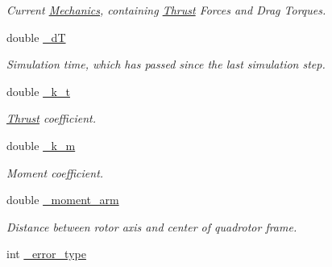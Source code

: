\begin{DoxyCompactItemize}
\begin{DoxyCompactList}\small\item\em \-Current \hyperlink{classMechanics}{\-Mechanics}, containing \hyperlink{classThrust}{\-Thrust} \-Forces and \-Drag \-Torques. \end{DoxyCompactList}\item 
\hypertarget{classQuadRotorDynamics_acb408bb34e58205c8c9239de6755a1ec}{double \hyperlink{classQuadRotorDynamics_acb408bb34e58205c8c9239de6755a1ec}{\-\_\-d\-T}}\label{classQuadRotorDynamics_acb408bb34e58205c8c9239de6755a1ec}

\begin{DoxyCompactList}\small\item\em \-Simulation time, which has passed since the last simulation step. \end{DoxyCompactList}\item 
\hypertarget{classQuadRotorDynamics_ad16ff51ab4ce8bec56f953da64fb71b9}{double \hyperlink{classQuadRotorDynamics_ad16ff51ab4ce8bec56f953da64fb71b9}{\-\_\-k\-\_\-t}}\label{classQuadRotorDynamics_ad16ff51ab4ce8bec56f953da64fb71b9}

\begin{DoxyCompactList}\small\item\em \hyperlink{classThrust}{\-Thrust} coefficient. \end{DoxyCompactList}\item 
\hypertarget{classQuadRotorDynamics_acf8efb67931462dba06fe187661010a7}{double \hyperlink{classQuadRotorDynamics_acf8efb67931462dba06fe187661010a7}{\-\_\-k\-\_\-m}}\label{classQuadRotorDynamics_acf8efb67931462dba06fe187661010a7}

\begin{DoxyCompactList}\small\item\em \-Moment coefficient. \end{DoxyCompactList}\item 
\hypertarget{classQuadRotorDynamics_af531365138f761c7210d78da8c92e95a}{double \hyperlink{classQuadRotorDynamics_af531365138f761c7210d78da8c92e95a}{\-\_\-moment\-\_\-arm}}\label{classQuadRotorDynamics_af531365138f761c7210d78da8c92e95a}

\begin{DoxyCompactList}\small\item\em \-Distance between rotor axis and center of quadrotor frame. \end{DoxyCompactList}\item 
\hypertarget{classQuadRotorDynamics_a44b7a5861b2f411029e2506f4cf1d532}{int \hyperlink{classQuadRotorDynamics_a44b7a5861b2f411029e2506f4cf1d532}{\-\_\-error\-\_\-type}}\label{classQuadRotorDynamics_a44b7a5861b2f411029e2506f4cf1d532}


\end{DoxyCompactItemize}

